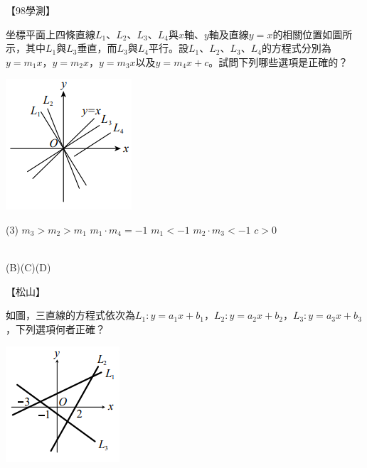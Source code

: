 \documentclass
[answers]
{exam}
\theoremstyle{definition}
\begin{document}
\begin{questions}
\question
【98學測】\\
\begin{minipage}[t]{0.7\linewidth}
	坐標平面上四條直線$L_1$、$L_2$、$L_3$、$L_4$與$x$軸、$y$軸及直線$y=x$的相關位置如圖所示，其中$L_1$與$L_3$垂直，而$L_3$與$L_4$平行。設$L_1$、$L_2$、$L_3$、$L_4$的方程式分別為$y=m_1x$，$y=m_2x$，$y=m_3x$以及$y=m_4x+c$。試問下列哪些選項是正確的？
\end{minipage}
\hfill
\begin{minipage}[t]{0.3\linewidth}
	\vspace*{-0.3cm}
	\includegraphics[scale=1]{./figure/11.png}
	\raggedleft %
\end{minipage}


\begin{tasks}(3)
	\tasks $m_3 > m_2 > m_1$
	\tasks $m_1 \cdot m_4 = -1$
	\tasks $m_1 < -1$
	\tasks $m_2 \cdot m_3 < -1$
	\tasks $c > 0$
\end{tasks}

\begin{solution}~\\
	(B)(C)(D)
\end{solution}

\question
【松山】\\
\begin{minipage}[t]{0.7\linewidth}
	如圖，三直線的方程式依次為$L_1:y=a_1x+b_1$，$L_2:y=a_2x+b_2$，$L_3:y=a_3x+b_3$，下列選項何者正確？
\end{minipage}
\hfill
\begin{minipage}[t]{0.3\linewidth}
	\vspace*{-0.3cm}
	\includegraphics[scale=1]{./figure/12.png}
	\raggedleft %
\end{minipage}



\end{questions}
\end{document}
